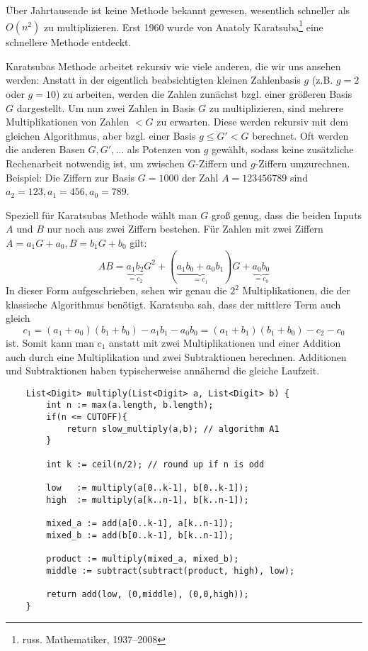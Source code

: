
\begin{remark}
Über Jahrtausende ist keine Methode bekannt gewesen, wesentlich schneller als $O(n^2)$ zu multiplizieren. Erst 1960 wurde von Anatoly Karatsuba\footnote{russ. Mathematiker, 1937--2008} eine schnellere Methode entdeckt.

\medskip
Karatsubas Methode arbeitet rekursiv wie viele anderen, die wir uns ansehen werden: Anstatt in der eigentlich beabsichtigten kleinen Zahlenbasis $g$ (z.B. $g=2$ oder $g=10$) zu arbeiten, werden die Zahlen zunächst bzgl. einer größeren Basis $G$ dargestellt. Um nun zwei Zahlen in Basis $G$ zu multiplizieren, sind mehrere Multiplikationen von Zahlen $<G$ zu erwarten. Diese werden rekursiv mit dem gleichen Algorithmus, aber bzgl. einer Basis $g\leq G'<G$ berechnet. Oft werden die anderen Basen $G,G', \ldots$ als Potenzen von $g$ gewählt, sodass keine zusätzliche Rechenarbeit notwendig ist, um zwischen $G$-Ziffern und $g$-Ziffern umzurechnen. Beispiel: Die Ziffern zur Basis $G=1000$ der Zahl $A=123456789$ sind $a_2=123, a_1=456, a_0=789$.

\medskip
Speziell für Karatsubas Methode wählt man $G$ groß genug, dass die beiden Inputs $A$ und $B$ nur noch aus zwei Ziffern bestehen. Für Zahlen mit zwei Ziffern $A=a_1G+a_0, B=b_1G+b_0$ gilt:
\[AB = \underbrace{a_1 b_2}_{=c_2} G^2 + (\underbrace{a_1 b_0+a_0 b_1}_{=c_1})G+\underbrace{a_0 b_0}_{=c_0}\]
In dieser Form aufgeschrieben, sehen wir genau die $2^2$ Multiplikationen, die der klassische Algorithmus benötigt. Karatsuba sah, dass der mittlere Term auch gleich
\[c_1 = (a_1+a_0)(b_1+b_0)-a_1 b_1-a_0b_0 = (a_1+b_1)(b_1+b_0)-c_2-c_0\]
ist. Somit kann man $c_1$ anstatt mit zwei Multiplikationen und einer Addition auch durch eine Multiplikation und zwei Subtraktionen berechnen. Additionen und Subtraktionen haben typischerweise annähernd die gleiche Laufzeit.
\end{remark}

\begin{algorithm}\label{alg:karatsuba}
    \begin{lstlisting}
    List<Digit> multiply(List<Digit> a, List<Digit> b) {
        int n := max(a.length, b.length);
        if(n <= CUTOFF){
            return slow_multiply(a,b); // algorithm A1
        }
    
        int k := ceil(n/2); // round up if n is odd
        
        low   := multiply(a[0..k-1], b[0..k-1]);
        high  := multiply(a[k..n-1], b[k..n-1]);
        
        mixed_a := add(a[0..k-1], a[k..n-1]);
        mixed_b := add(b[0..k-1], b[k..n-1]);
        
        product := multiply(mixed_a, mixed_b);
        middle := subtract(subtract(product, high), low);
        
        return add(low, (0,middle), (0,0,high));
    }    
    \end{lstlisting}
\end{algorithm}

